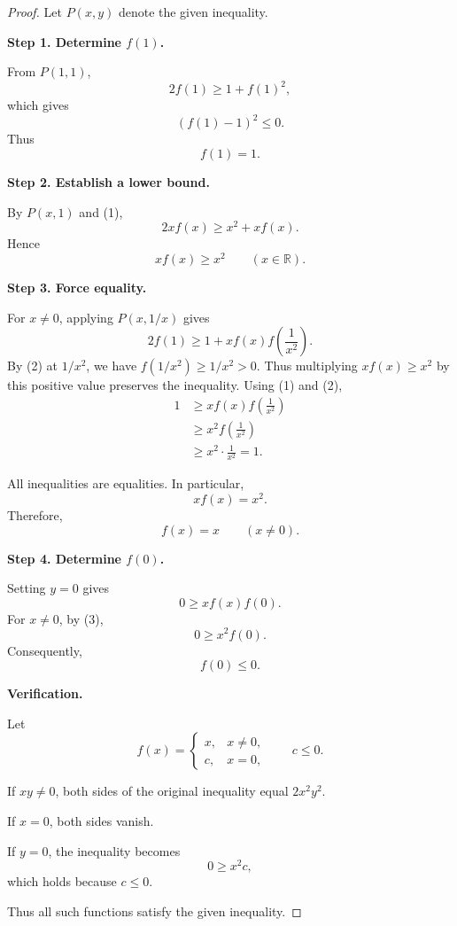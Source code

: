 
\begin{dlsummary}[title={\bfseries Solution 15. FEOO 2020 Shortlist -- Algebra A1},breakable]

\begin{proof}
Let $P(x,y)$ denote the given inequality.

\medskip
\noindent
\textbf{Step 1. Determine $f(1)$.}

From $P(1,1)$,
\[
2f(1)\geq1+f(1)^2,
\]
which gives
\[
(f(1)-1)^2\leq0.
\]
Thus
\[
\boxed{f(1)=1.} \tag{1}
\]

\medskip
\noindent
\textbf{Step 2. Establish a lower bound.}

By $P(x,1)$ and (1),
\[
2xf(x)\geq x^2+xf(x).
\]
Hence
\[
\boxed{xf(x)\geq x^2
\qquad(x\in\mathbb R).} \tag{2}
\]

\medskip
\noindent
\textbf{Step 3. Force equality.}

For $x\ne0$, applying $P(x,1/x)$ gives
\[
2f(1)\geq
1+xf(x)f\left(\frac1{x^2}\right).
\]
By (2) at $1/x^2$, we have
$f(1/x^2)\geq1/x^2>0$. Thus multiplying $xf(x)\geq x^2$ by this
positive value preserves the inequality. Using (1) and (2),
\[
\begin{aligned}
1
&\geq xf(x)f\left(\frac1{x^2}\right)\\
&\geq x^2f\left(\frac1{x^2}\right)\\
&\geq x^2\cdot\frac1{x^2}=1.
\end{aligned}
\]

All inequalities are equalities.
In particular,
\[
xf(x)=x^2.
\]
Therefore,
\[
\boxed{f(x)=x\qquad(x\ne0).} \tag{3}
\]

\medskip
\noindent
\textbf{Step 4. Determine $f(0)$.}

Setting $y=0$ gives
\[
0\geq xf(x)f(0).
\]
For $x\ne0$, by (3),
\[
0\geq x^2f(0).
\]
Consequently,
\[
\boxed{f(0)\leq0.}
\]

\medskip
\noindent
\textbf{Verification.}

Let
\[
f(x)=
\begin{cases}
x,&x\ne0,\\
c,&x=0,
\end{cases}
\qquad c\leq0.
\]

If $xy\ne0$, both sides of the original
inequality equal $2x^2y^2$.

If $x=0$, both sides vanish.

If $y=0$, the inequality becomes
\[
0\geq x^2c,
\]
which holds because $c\leq0$.

Thus all such functions satisfy the
given inequality.
\end{proof}

\end{dlsummary}
